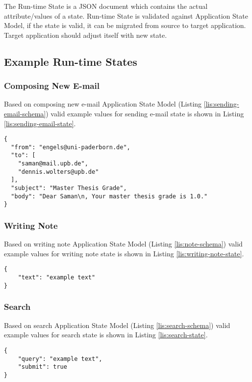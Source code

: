 The Run-time State is a JSON document which contains the actual attribute/values of a state. Run-time State is validated against Application State Model, if the state is valid, it can be migrated from source to target application.
Target application should adjust itself with new state.

\subsection{Example Run-time States}

\subsubsection{Composing New E-mail}
Based on composing new e-mail Application State Model (Listing \ref{lis:sending-email-schema}) valid example values for sending e-mail state is shown in Listing \ref{lis:sending-email-state}.

\lstset{
  label=lis:sending-email-state, caption=A Run-time State for sending e-mail as JSON document., 
  basicstyle=\ttfamily\footnotesize, frame=single, captionpos=b,
  xleftmargin=.15\textwidth, xrightmargin=.15\textwidth
}
\begin{lstlisting}
{
  "from": "engels@uni-paderborn.de",
  "to": [
    "saman@mail.upb.de",
    "dennis.wolters@upb.de"
  ],
  "subject": "Master Thesis Grade",
  "body": "Dear Saman\n, Your master thesis grade is 1.0."
}
\end{lstlisting}


\subsubsection{Writing Note}
Based on writing note Application State Model (Listing \ref{lis:note-schema}) valid example values for writing note state is shown in Listing \ref{lis:writing-note-state}.
 
\lstset{
  label=lis:writing-note-state, caption=A Run-time State for writing note as JSON document., 
  basicstyle=\ttfamily\footnotesize, frame=single, captionpos=b,
  xleftmargin=.15\textwidth, xrightmargin=.15\textwidth
}
\begin{lstlisting}
{
    "text": "example text"
}
\end{lstlisting}

\subsubsection{Search}
Based on search Application State Model (Listing \ref{lis:search-schema}) valid example values for search state is shown in Listing \ref{lis:search-state}.
\lstset{
  label=lis:search-state, caption=A Run-time State for search as JSON document., 
  basicstyle=\ttfamily\footnotesize, frame=single, captionpos=b,
  xleftmargin=.15\textwidth, xrightmargin=.15\textwidth
}
\begin{lstlisting}
{
    "query": "example text",
    "submit": true
}
\end{lstlisting}
